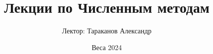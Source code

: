 \documentclass{article}
\begin{document}
\title{Лекции по Численным методам}
\author{Лектор: Тараканов Александр}
\date{Веса 2024}

\maketitle
\tableofcontents



\end{document}
